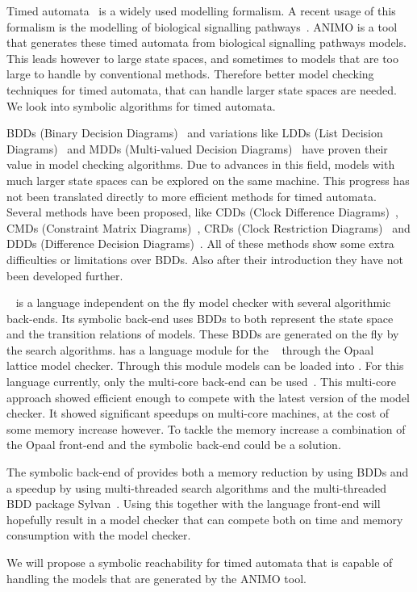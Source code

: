 Timed automata~\cite{Alur1994183} is a widely used modelling formalism. A recent usage of this formalism is the modelling of biological signalling pathways~\cite{DBLP:conf/bibe/SchivoSWCVKLPP12}. ANIMO is a tool that generates these timed automata from biological signalling pathways models. This leads however to large state spaces, and sometimes to models that are too large to handle by conventional methods. Therefore better model checking techniques for timed automata, that can handle larger state spaces are needed. We look into symbolic algorithms for timed automata.

BDDs (Binary Decision Diagrams)~\cite{Akers:1978:BDD:1310167.1310815,1676819} and variations like LDDs (List Decision Diagrams)~\cite{so62465} and MDDs (Multi-valued Decision Diagrams)~\cite{129849} have proven their value in model checking algorithms. Due to advances in this field, models with much larger state spaces can be explored on the same machine. This progress has not been translated directly to more efficient methods for timed automata. Several methods have been proposed, like CDDs (Clock Difference Diagrams)~\cite{BRICS19491}, CMDs (Constraint Matrix Diagrams)~\cite{5702245}, CRDs (Clock Restriction Diagrams)~\cite{crds} and DDDs (Difference Decision Diagrams)~\cite{ddds, ddd-datastructure-99}. All of these methods show some extra difficulties or limitations over BDDs. Also after their introduction they have not been developed further.

\ltsmin{}~\cite{eemcs18152,ltsmin-mc:nmf2011} is a language independent on the fly model checker with several algorithmic back-ends. Its symbolic back-end uses BDDs to both represent the state space and the transition relations of models. These BDDs are generated on the fly by the search algorithms. \ltsmin{} has a language module for the \uppaal{}~\cite{UPPAAL} through the Opaal~\cite{opaal} lattice model checker. Through this module \uppaal{} models can be loaded into \ltsmin{}. For this language currently, only the multi-core back-end can be used~\cite{eemcs21972}. This multi-core approach showed efficient enough to compete with the latest version of the \uppaal{} model checker. It showed significant speedups on multi-core machines, at the cost of some memory increase however. To tackle the memory increase a combination of the Opaal front-end and the symbolic back-end could be a solution.

The symbolic back-end of \ltsmin{} provides both a memory reduction by using BDDs and a speedup by using multi-threaded search algorithms and the multi-threaded BDD package Sylvan~\cite{sylvan}. Using this together with the \uppaal{} language front-end will hopefully result in a model checker that can compete both on time and memory consumption with the \uppaal{} model checker.

We will propose a symbolic reachability for timed automata that is capable of handling the models that are generated by the ANIMO tool.